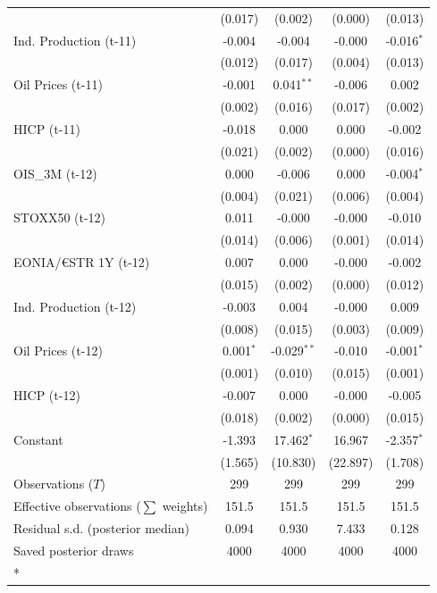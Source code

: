 \begin{longtable}[t]{lcccc}
 & (0.017) & (0.002) & (0.000) & (0.013)\\
Ind. Production (t-11) & -0.004 & -0.004 & -0.000 & -0.016$^{*}$\\
 & (0.012) & (0.017) & (0.004) & (0.013)\\
Oil Prices (t-11) & -0.001 & 0.041$^{**}$ & -0.006 & 0.002\\
 & (0.002) & (0.016) & (0.017) & (0.002)\\
HICP (t-11) & -0.018 & 0.000 & 0.000 & -0.002\\
 & (0.021) & (0.002) & (0.000) & (0.016)\\
OIS\_3M (t-12) & 0.000 & -0.006 & 0.000 & -0.004$^{*}$\\
 & (0.004) & (0.021) & (0.006) & (0.004)\\
STOXX50 (t-12) & 0.011 & -0.000 & -0.000 & -0.010\\
 & (0.014) & (0.006) & (0.001) & (0.014)\\
EONIA/€STR 1Y (t-12) & 0.007 & 0.000 & -0.000 & -0.002\\
 & (0.015) & (0.002) & (0.000) & (0.012)\\
Ind. Production (t-12) & -0.003 & 0.004 & -0.000 & 0.009\\
 & (0.008) & (0.015) & (0.003) & (0.009)\\
Oil Prices (t-12) & 0.001$^{*}$ & -0.029$^{**}$ & -0.010 & -0.001$^{*}$\\
 & (0.001) & (0.010) & (0.015) & (0.001)\\
HICP (t-12) & -0.007 & 0.000 & -0.000 & -0.005\\
 & (0.018) & (0.002) & (0.000) & (0.015)\\
Constant & -1.393 & 17.462$^{*}$ & 16.967 & -2.357$^{*}$\\
 & (1.565) & (10.830) & (22.897) & (1.708)\\
\midrule
Observations ($T$) & 299 & 299 & 299 & 299\\
Effective observations ($\sum$ weights) & 151.5 & 151.5 & 151.5 & 151.5\\
Residual s.d. (posterior median) & 0.094 & 0.930 & 7.433 & 0.128\\
Saved posterior draws & 4000 & 4000 & 4000 & 4000\\*
\end{longtable}
\endgroup{}

\begingroup\fontsize{7}{9}\selectfont

